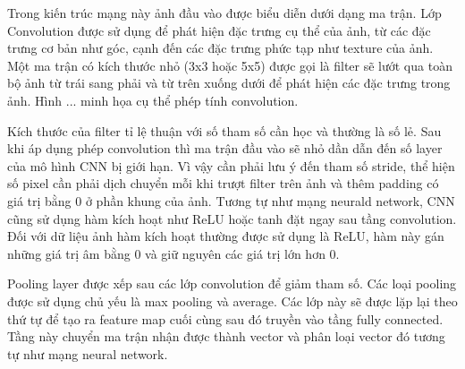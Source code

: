 Trong kiến trúc mạng này ảnh đầu vào được biểu diễn dưới dạng ma trận. Lớp Convolution được sử dụng để phát hiện đặc trưng cụ thể của ảnh, từ các đặc trưng cơ bản như góc, cạnh đến các đặc trưng phức tạp như texture của ảnh. Một ma trận có kích thước nhỏ (3x3 hoặc 5x5) được gọi là filter sẽ lướt qua toàn bộ ảnh từ trái sang phải và từ trên xuống dưới để phát hiện các đặc trưng trong ảnh. Hình ... minh họa cụ thể phép tính convolution. 

Kích thước của filter tỉ lệ thuận với số tham số cần học và thường là số lẻ. Sau khi áp dụng phép convolution thì ma trận đầu vào sẽ nhỏ dần dẫn đến số layer của mô hình CNN bị giới hạn. Vì vậy cần phải lưu ý đến tham số stride, thể hiện số pixel cần phải dịch chuyển mỗi khi trượt filter trên ảnh và thêm padding có giá trị bằng 0 ở phần khung của ảnh. Tương tự như mạng neurald network, CNN cũng sử dụng hàm kích hoạt như ReLU hoặc tanh đặt ngay sau tầng convolution. Đối với dữ liệu ảnh hàm kích hoạt thường được sử dụng là ReLU, hàm này gán những giá trị âm bằng 0 và giữ nguyên các giá trị lớn hơn 0.

Pooling layer được xếp sau các lớp convolution để giảm tham số. Các loại pooling được sử dụng chủ yếu là max pooling và average. Các lớp này sẽ được lặp lại theo thứ tự để tạo ra feature map cuối cùng sau đó truyền vào tầng fully connected. Tầng này chuyển ma trận nhận được thành vector và phân loại vector đó tương tự như mạng neural network.


